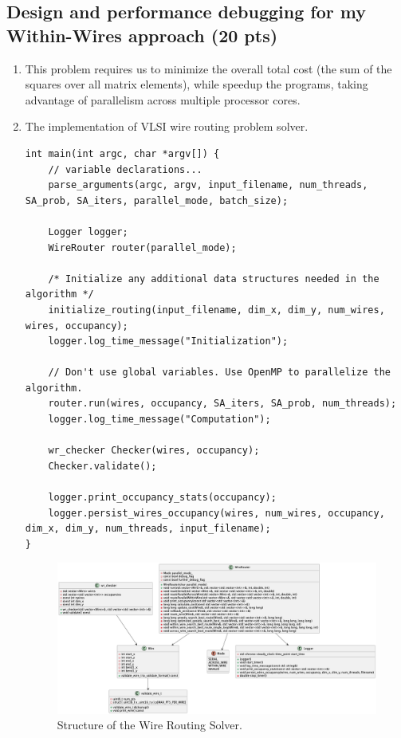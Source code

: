 \documentclass[letterpaper,11pt]{exam}
\begin{document}
\begin{questions}
    \question
    \subsection*{Design and performance debugging for my Within-Wires approach (20 pts)}

    \begin{enumerate}[label=\roman*.]
        \item This problem requires us to minimize the overall total cost (the sum of the squares over all matrix elements),
              while speedup the programs, taking advantage of parallelism across multiple processor cores.

        \item The implementation of VLSI wire routing problem solver.

              \begin{lstlisting}[]
int main(int argc, char *argv[]) {
    // variable declarations...
    parse_arguments(argc, argv, input_filename, num_threads, SA_prob, SA_iters, parallel_mode, batch_size);

    Logger logger;
    WireRouter router(parallel_mode);

    /* Initialize any additional data structures needed in the algorithm */
    initialize_routing(input_filename, dim_x, dim_y, num_wires, wires, occupancy);
    logger.log_time_message("Initialization");

    // Don't use global variables. Use OpenMP to parallelize the algorithm.
    router.run(wires, occupancy, SA_iters, SA_prob, num_threads);
    logger.log_time_message("Computation");

    wr_checker Checker(wires, occupancy);
    Checker.validate();

    logger.print_occupancy_stats(occupancy);
    logger.persist_wires_occupancy(wires, num_wires, occupancy, dim_x, dim_y, num_threads, input_filename);
}
                \end{lstlisting}

              \begin{figure}[h!]
                  \centering
                  \includegraphics[width=\textwidth]{./img/structure.png}
                  \caption{Structure of the Wire Routing Solver.}
                  \label{fig:structure}
              \end{figure}


\end{enumerate}
\end{questions}
\end{document}
